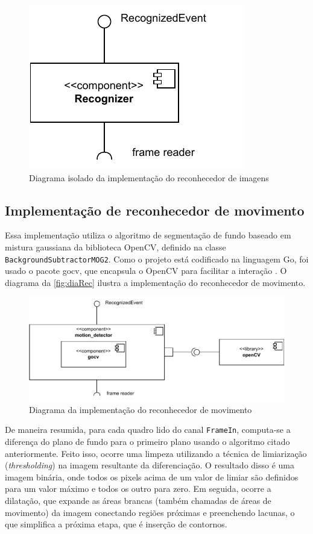 \documentclass[12pt, %
openright, 
oneside, %
a4paper,    %
brazil]{facom-ufu-abntex2}
\begin{document}
\begin{figure}[!ht]
	\centering
	\includegraphics[width=0.4\linewidth]{recognizer.pdf}
	\caption[Diagrama isolado da implementação do reconhecedor de
		imagens]{Diagrama isolado da implementação do reconhecedor de imagens}
	\label{fig:diaImg}
\end{figure}

\subsection{Implementação de reconhecedor de movimento}

Essa implementação utiliza o algoritmo de segmentação de fundo baseado em
mistura gaussiana da biblioteca OpenCV, definido na classe
\texttt{BackgroundSubtractorMOG2}. Como o projeto está codificado na linguagem
Go, foi usado o pacote gocv, que encapsula o OpenCV para facilitar a interação
\cite{gocv_package}. O diagrama da \autoref{fig:diaRec} ilustra a implementação
do reconhecedor de movimento.

\begin{figure}[!ht]
	\centering
	\includegraphics[width=1.0\linewidth]{motion_detector.pdf}
	\caption[Diagrama da implementação do reconhecedor de
		movimento]{Diagrama da implementação do reconhecedor de movimento}
	\label{fig:diaRec}
\end{figure}

De maneira resumida, para cada quadro lido do canal \texttt{FrameIn},
computa-se a diferença do plano de fundo para o primeiro plano usando o
algoritmo citado anteriormente. Feito isso, ocorre uma limpeza utilizando a
técnica de limiarização (\textit{thresholding}) na imagem resultante da
diferenciação. O resultado disso é uma imagem binária, onde todos os pixels
acima de um valor de limiar são definidos para um valor máximo e todos os outro
para zero. Em seguida, ocorre a dilatação, que expande as áreas brancas (também
chamadas de áreas de movimento) da imagem conectando regiões próximas e
preenchendo lacunas, o que simplifica a próxima etapa, que é inserção de
contornos.
\end{document}
